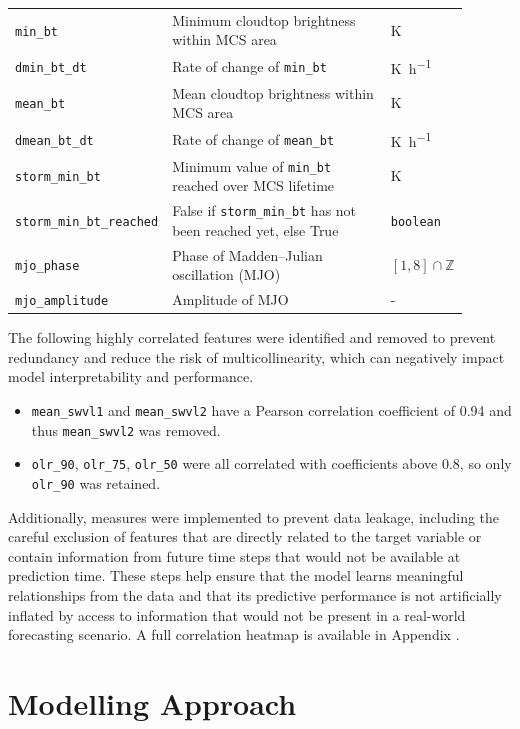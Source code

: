 {\begin{longtable}{>{\raggedright\arraybackslash}p{0.25\linewidth} p{0.50\linewidth} >{\raggedright\arraybackslash}p{0.15\linewidth}}
    \texttt{min\_bt} & Minimum cloudtop brightness within MCS area & \unit{\kelvin} \\
    \texttt{dmin\_bt\_dt} & Rate of change of \texttt{min\_bt} & \unit{\kelvin\per\hour} \\
    \texttt{mean\_bt} & Mean cloudtop brightness within MCS area & \unit{\kelvin} \\
    \texttt{dmean\_bt\_dt} & Rate of change of \texttt{mean\_bt} & \unit{\kelvin\per\hour} \\
    \texttt{storm\_min\_bt} & Minimum value of \texttt{min\_bt} reached over MCS lifetime & \unit{\kelvin} \\
    \texttt{storm\_min\_bt\_reached} & False if \texttt{storm\_min\_bt} has not been reached yet, else True & \texttt{boolean} \\
    \texttt{mjo\_phase} & Phase of Madden--Julian oscillation (MJO) & $[1, 8] \cap \mathbb{Z}$ \\
    \texttt{mjo\_amplitude} & Amplitude of MJO & - \\
\end{longtable}
}

The following highly correlated features were identified and removed to prevent redundancy and reduce the risk of multicollinearity, which can negatively impact model interpretability and performance.
\begin{itemize}
    \item \texttt{mean\_swvl1} and \texttt{mean\_swvl2} have a Pearson correlation coefficient of 0.94 and thus \texttt{mean\_swvl2} was removed.
    \item \texttt{olr\_90}, \texttt{olr\_75}, \texttt{olr\_50} were all correlated with coefficients above 0.8, so only \texttt{olr\_90} was retained.
\end{itemize}
Additionally, measures were implemented to prevent data leakage, including the careful exclusion of features that are directly related to the target variable or contain information from future time steps that would not be available at prediction time. These steps help ensure that the model learns meaningful relationships from the data and that its predictive performance is not artificially inflated by access to information that would not be present in a real-world forecasting scenario. A full correlation heatmap is available in Appendix .

\section{Modelling Approach}

